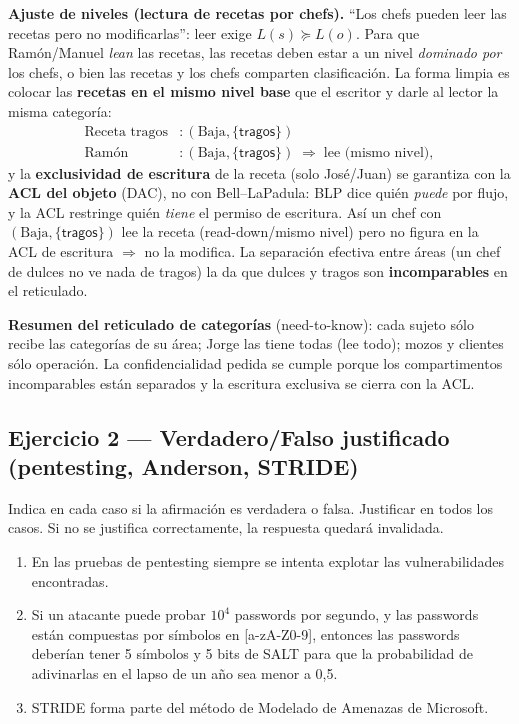 \textbf{Ajuste de niveles (lectura de recetas por chefs).} ``Los chefs pueden leer las recetas
pero no modificarlas'': leer exige $L(s)\succeq L(o)$. Para que Ramón/Manuel
\emph{lean} las recetas, las recetas deben estar a un nivel \emph{dominado por} los chefs, o
bien las recetas y los chefs comparten clasificación. La forma limpia es colocar las
\textbf{recetas en el mismo nivel base} que el escritor y darle al lector la misma categoría:
\begin{align*}
  \text{Receta tragos} &: (\text{Baja},\{\textsf{tragos}\}) \\
  \text{Ramón} &: (\text{Baja},\{\textsf{tragos}\}) \;\Rightarrow\; \text{lee (mismo nivel)},
\end{align*}
y la \textbf{exclusividad de escritura} de la receta (solo José/Juan) se garantiza con la
\textbf{ACL del objeto} (DAC), no con Bell--LaPadula: BLP dice quién \emph{puede} por flujo,
y la ACL restringe quién \emph{tiene} el permiso de escritura. Así un chef con
$(\text{Baja},\{\textsf{tragos}\})$ lee la receta (read-down/mismo nivel) pero no figura en la
ACL de escritura $\Rightarrow$ no la modifica. La separación efectiva entre áreas (un chef de
dulces no ve nada de tragos) la da que \textsf{dulces} y \textsf{tragos} son
\textbf{incomparables} en el reticulado.

\medskip
\textbf{Resumen del reticulado de categorías} (need-to-know): cada sujeto sólo recibe las
categorías de su área; Jorge las tiene todas (lee todo); mozos y clientes sólo
\textsf{operación}. La confidencialidad pedida se cumple porque los compartimentos
incomparables están separados y la escritura exclusiva se cierra con la ACL.

\subsection{Ejercicio 2 — Verdadero/Falso justificado (pentesting, Anderson, STRIDE)}

\begin{consigna}
Indica en cada caso si la afirmación es verdadera o falsa. Justificar en todos los casos. Si no se justifica correctamente, la respuesta quedará invalidada.
\begin{enumerate}[label=\alph*)]
  \item En las pruebas de pentesting siempre se intenta explotar las vulnerabilidades encontradas.
  \item Si un atacante puede probar $10^4$ passwords por segundo, y las passwords están compuestas por símbolos en [a-zA-Z0-9], entonces las passwords deberían tener 5 símbolos y 5 bits de SALT para que la probabilidad de adivinarlas en el lapso de un año sea menor a 0,5.
  \item STRIDE forma parte del método de Modelado de Amenazas de Microsoft.
\end{enumerate}
\end{consigna}

